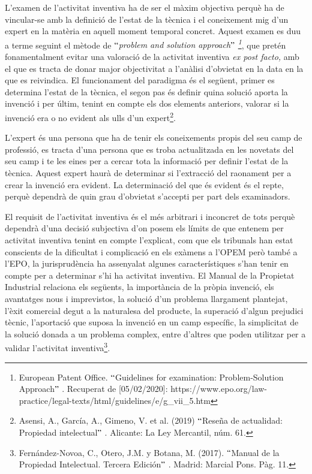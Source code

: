 \documentclass[12pt]{article}
\begin{document}
\vspace{\baselineskip}
L’examen de l’activitat inventiva ha de ser el màxim objectiva perquè ha de vincular-se amb la definició de l’estat de la tècnica i el coneixement mig d’un expert en la matèria en aquell moment temporal concret. Aquest examen es duu a terme seguint el mètode de $``$\textit{problem and solution approach$"$ \footnote{ European Patent Office. $``$Guidelines for examination: Problem-Solution Approach$"$ . Recuperat de [05/02/2020]: https://www.epo.org/law-practice/legal-texts/html/guidelines/e/g\_vii\_5.htm }}, que pretén fonamentalment evitar una valoració de la activitat inventiva \textit{ex post facto, }amb el que es tracta de donar major objectivitat a l’anàlisi d’obvietat en la data en la que es reivindica. El funcionament del paradigma és el següent, primer es determina l’estat de la tècnica, el segon pas és definir quina solució aporta la invenció i per últim, tenint en compte els dos elements anteriors, valorar si la invenció era o no evident als ulls d’un expert\footnote{ Asensi, A., García, A., Gimeno, V. et al. (2019) $``$Reseña de actualidad: Propiedad intelectual$"$ . Alicante: La Ley Mercantil, núm. 61.  }. \par

L’expert és una persona que ha de tenir els coneixements propis del seu camp de professió, es tracta d’una persona que es troba actualitzada en les novetats del seu camp i te les eines per a cercar tota la informació per definir l’estat de la tècnica. Aquest expert haurà de determinar si l’extracció del raonament per a crear la invenció era evident. La determinació del que és evident és el repte, perquè dependrà de quin grau d’obvietat s’accepti per part dels examinadors.  \par


\vspace{\baselineskip}
El requisit de l’activitat inventiva és el més arbitrari i inconcret de tots perquè dependrà d’una decisió subjectiva d’on posem els límits de que entenem per activitat inventiva tenint en compte l’explicat, com que els tribunals han estat conscients de la dificultat i complicació en els exàmens a l’OPEM però també a l’EPO, la jurisprudència ha assenyalat algunes característiques s’han tenir en compte per a determinar s’hi ha activitat inventiva. El Manual de la Propietat Industrial relaciona els següents, la importància de la pròpia invenció, els avantatges nous  i imprevistos, la solució d’un problema llargament plantejat, l’èxit comercial degut a la naturalesa del producte, la superació d’algun prejudici tècnic, l’aportació que suposa la invenció en un camp específic, la simplicitat de la solució donada a un problema complex, entre d’altres que poden utilitzar per a validar l’activitat inventiva\footnote{ Fernández-Novoa, C., Otero, J.M. y Botana, M. (2017). $``$Manual de la Propiedad Intelectual. Tercera Edición$"$ . Madrid: Marcial Pons. Pàg. 11. }. \par
\end{document}
